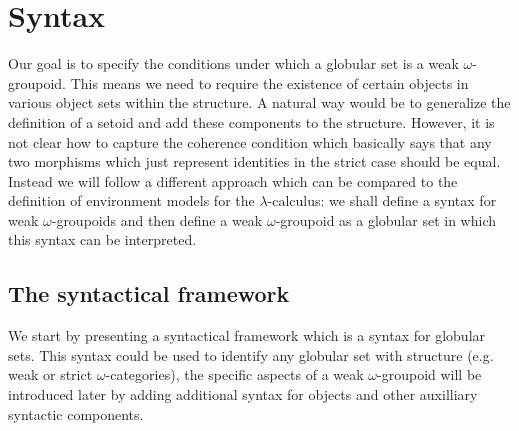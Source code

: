 \section{Syntax}\label{sec:syntax}


Our goal is to specify the conditions under which a globular set is a
weak $\omega$-groupoid. This means we need to require the existence of
certain objects in various object sets within the structure. A natural
way would be to generalize the definition of a setoid and add these
components to the structure. However,  it is not clear how to capture
the coherence condition which basically says that any two morphisms
which just represent identities in the strict case should be
equal. Instead we will follow a different approach which can be
compared to the definition of environment models for the
$\lambda$-calculus: we shall define a syntax for weak
$\omega$-groupoids and then define a weak $\omega$-groupoid as a
globular set in which this syntax can be interpreted.

\subsection{The syntactical framework}
\label{sec:syntactical-framework}

We start by presenting a syntactical framework which is a syntax for
globular sets. This syntax could be used to identify any globular set
with structure (e.g. weak or strict $\omega$-categories), the specific
aspects of a weak $\omega$-groupoid will be introduced later by adding
additional syntax for objects and other auxilliary syntactic
components. 

